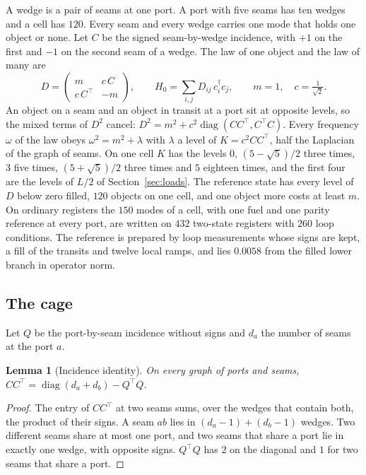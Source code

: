 \documentclass[11pt]{article}
\newtheorem{lemma}[theorem]{Lemma}
\theoremstyle{definition}
\theoremstyle{remark}
\theoremstyle{plain}
\begin{document}
A wedge is a pair of seams at one port. A port with five seams has ten
wedges and a cell has $120$. Every seam and every wedge carries one mode
that holds one object or none. Let $C$ be the signed seam-by-wedge
incidence, with $+1$ on the first and $-1$ on the second seam of a wedge.
The law of one object and the law of many are
\begin{equation}
D=\begin{pmatrix}m&c\,C\\ c\,C^{\top}&-m\end{pmatrix},
\qquad
H_0=\sum_{i,j}D_{ij}\,c_i^{\dagger}c_j,
\qquad m=1,\quad c=\tfrac{1}{\sqrt2}.
\label{eq:scalar}
\end{equation}
An object on a seam and an object in transit at a port sit at opposite
levels, so the mixed terms of $D^2$ cancel:
$D^2=m^2+c^2\operatorname{diag}(CC^{\top},C^{\top}C)$. Every frequency
$\omega$ of the law obeys $\omega^2=m^2+\lambda$ with $\lambda$ a level of
$K=c^2CC^{\top}$, half the Laplacian of the graph of seams. On one cell $K$
has the levels $0$, $(5-\sqrt5)/2$ three times, $3$ five times,
$(5+\sqrt5)/2$ three times and $5$ eighteen times, and the first four are
the levels of $L/2$ of Section~\ref{sec:loads}. The reference state has
every level of $D$ below zero filled, $120$ objects on one cell, and one
object more costs at least $m$. On ordinary registers the $150$ modes of a
cell, with one fuel and one parity reference at every port, are written on
$432$ two-state registers with $260$ loop conditions. The reference is
prepared by loop measurements whose signs are kept, a fill of the transits
and twelve local ramps, and lies $0.0058$ from the filled lower branch in
operator norm.

\subsection{The cage}

Let $Q$ be the port-by-seam incidence without signs and $d_a$ the number of
seams at the port $a$.

\begin{lemma}[Incidence identity]
\label{lem:linegraph}
On every graph of ports and seams,
$CC^{\top}=\operatorname{diag}(d_a+d_b)-Q^{\top}Q$.
\end{lemma}

\begin{proof}
The entry of $CC^{\top}$ at two seams sums, over the wedges that contain
both, the product of their signs. A seam $ab$ lies in $(d_a-1)+(d_b-1)$
wedges. Two different seams share at most one port, and two seams that share
a port lie in exactly one wedge, with opposite signs. $Q^{\top}Q$ has $2$ on
the diagonal and $1$ for two seams that share a port.
\end{proof}
\end{document}
